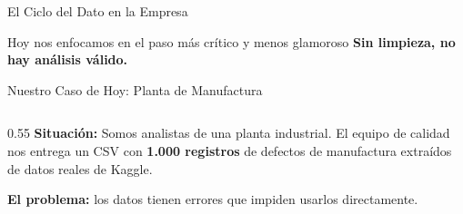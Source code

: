 \documentclass[aspectratio=169]{beamer}
\begin{document}
\begin{frame}{El Ciclo del Dato en la Empresa}
  \vspace{0.3cm}
  \begin{alertblock}{\faArrowRight\enspace Hoy nos enfocamos en el paso más crítico y menos glamoroso}
    \centering\small
    \textbf{Sin limpieza, no hay análisis válido.}
  \end{alertblock}
\end{frame}


\begin{frame}{Nuestro Caso de Hoy: Planta de Manufactura}
  \begin{columns}[T]
    \begin{column}{0.55\textwidth}
      \small
      \textbf{Situación:} Somos analistas de una planta industrial. El equipo de calidad nos entrega un CSV con \textbf{1.000 registros} de defectos de manufactura extraídos de datos reales de Kaggle.

      \vspace{0.12cm}
      \textbf{El problema:} los datos tienen errores que impiden usarlos directamente.


\end{column}
\end{columns}
\end{frame}
\end{document}
